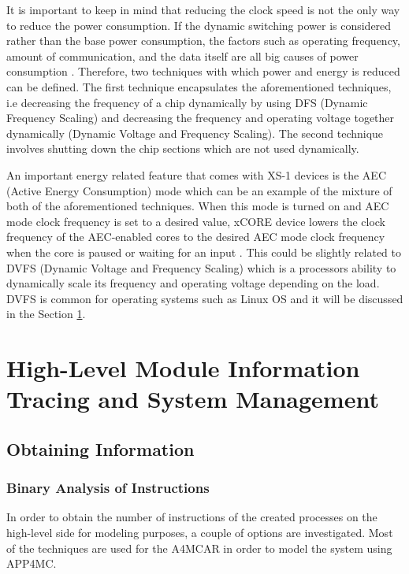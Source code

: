 It is important to keep in mind that reducing the clock speed is not the only way to reduce the power consumption. If the dynamic switching power is considered rather than the base power consumption, the factors such as operating frequency, amount of communication, and the data itself are all big causes of power consumption \cite{xs1energymanual}. Therefore, two techniques with which power and energy is reduced can be defined. The first technique encapsulates the aforementioned techniques, i.e decreasing the frequency of a chip dynamically by using DFS (Dynamic Frequency Scaling) and decreasing the frequency and operating voltage together dynamically (Dynamic Voltage and Frequency Scaling). The second technique involves shutting down the chip sections which are not used dynamically.

An important energy related feature that comes with XS-1 devices is the AEC (Active Energy Consumption) mode \cite{xs1energymanual} which can be an example of the mixture of both of the aforementioned techniques. When this mode is turned on and AEC mode clock frequency is set to a desired value, xCORE device lowers the clock frequency of the AEC-enabled cores to the desired AEC mode clock frequency when the core is paused or waiting for an input \cite{xs1energymanual}. This could be slightly related to DVFS (Dynamic Voltage and Frequency Scaling) \cite{dvfsieee} which is a processors ability to dynamically scale its frequency and operating voltage depending on the load. DVFS is common for operating systems such as Linux OS and it will be discussed in the Section \ref{hlinfg}.

\section{High-Level Module Information Tracing and System Management}\label{hlinfg}

\subsection{Obtaining Information}
\subsubsection{Binary Analysis of Instructions}
In order to obtain the number of instructions of the created processes on the high-level side for modeling purposes, a couple of options are investigated. Most of the techniques are used for the A4MCAR in order to model the system using APP4MC.

